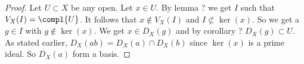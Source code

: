 \begin{proof}
Let $U\subset X$ be any open. Let $x\in U$.
By lemma ? we get $I$ such that $V_X(I) = \compl{U}$.
It follows that $x\not\in V_X(I)$ and $I\not\subset \ker(x)$.
So we get a $g\in I$ with $g\not\in \ker(x)$.
We get $x\in D_X(g)$ and by corollary ?%
$D_X(g) \subset U$.
As stated earlier, $D_X(ab) = D_X(a) \cap D_X(b)$ since $\ker(x)$ is a prime ideal.
So $D_X(a)$ form a basis.
\end{proof}